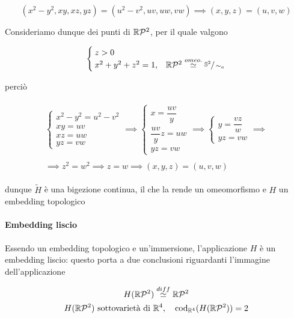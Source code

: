 {\begin{equation}
	(x^{2}-y^{2},xy,xz,yz) = (u^{2}-v^{2},uv,uw,vw) \implies (x,y,z) = (u,v,w)
\end{equation}

Consideriamo dunque dei punti di $ \mathbb{R}\mathcal{P}^{2} $, per il quale valgono

\begin{equation}
	\begin{cases}
		z > 0 \\
		x^{2} + y^{2} + z^{2} = 1, & \mathbb{R}\mathcal{P}^{2} \stackrel{omeo.}{\simeq} \sfrac{\mathbb{S}^{2}}{\sim_{a}}
	\end{cases}
\end{equation}

perciò

\begin{gather}
	\begin{split}
		\begin{cases}
			x^{2} - y^{2} = u^{2} - v^{2} \\
			xy = uv \\
			xz = uw \\
			yz = vw
		\end{cases} %
		\implies %
		\begin{cases}
			x = \dfrac{uv}{y} \\
			\dfrac{uv}{y} z = uw \\
			yz = vw
		\end{cases} %
		\implies %
		\begin{cases}
			y = \dfrac{vz}{w} \\
			yz = vw
		\end{cases} %
		\implies \\ \\
		\implies %
		z^{2} = w^{2}
		\implies %
		z = w
		\implies %
		(x,y,z) = (u,v,w)
	\end{split}
\end{gather}

dunque $ \tilde{H} $ è una bigezione continua, il che la rende un omeomorfismo e $ H $ un embedding topologico

\paragraph{Embedding liscio}

Essendo un embedding topologico e un'immersione, l'applicazione $ H $ è un embedding liscio: questo porta a due conclusioni riguardanti l'immagine dell'applicazione

\begin{gather}
	H(\rp{2}) \stackrel{diff}{\simeq} \rp{2} \\
	H(\rp{2}) \text{ sottovarietà di } \R^{4} \qcomma \operatorname{cod}_{\R^{4}} (H(\rp{2})) = 2
\end{gather}
}

